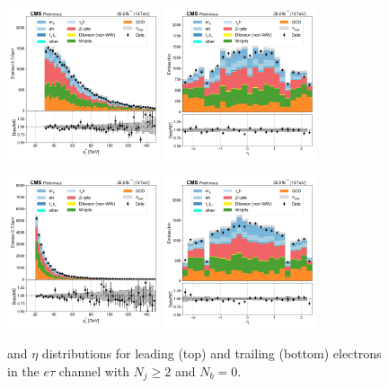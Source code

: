 \begin{figure}[htb!]
    \centering
    \includegraphics[width=0.4\textwidth]{chapters/Appendix/sectionPlots/figures/data_mc_overlays/etau_2016_cat_gt2_eq0_signal_linear_lepton_lepton1_pt}
    \includegraphics[width=0.4\textwidth]{chapters/Appendix/sectionPlots/figures/data_mc_overlays/etau_2016_cat_gt2_eq0_signal_linear_lepton_lepton1_eta}

    \includegraphics[width=0.4\textwidth]{chapters/Appendix/sectionPlots/figures/data_mc_overlays/etau_2016_cat_gt2_eq0_signal_linear_lepton_lepton2_pt}
    \includegraphics[width=0.4\textwidth]{chapters/Appendix/sectionPlots/figures/data_mc_overlays/etau_2016_cat_gt2_eq0_signal_linear_lepton_lepton2_eta}
    \caption{\pt and $\eta$ distributions for leading (top) and trailing
        (bottom) electrons in the $e\tau$ channel with $N_{j} \geq 2$ and
        $N_{b} = 0$.}
    \label{fig:etau_4_kinematic}
\end{figure}

